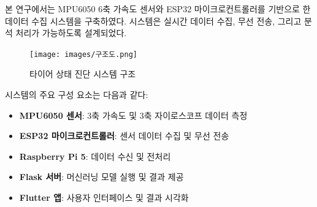 \documentclass[12pt,a4paper]{article}
\begin{document}
본 연구에서는 MPU6050 6축 가속도 센서와 ESP32 마이크로컨트롤러를 기반으로 한 데이터 수집 시스템을 구축하였다. 시스템은 실시간 데이터 수집, 무선 전송, 그리고 분석 처리가 가능하도록 설계되었다.

\begin{figure}[H]
    \centering
    \texttt{[image: images/구조도.png]}
    \caption{타이어 상태 진단 시스템 구조}
    \label{fig:system_architecture}
\end{figure}

시스템의 주요 구성 요소는 다음과 같다:

\begin{itemize}
    \item \textbf{MPU6050 센서}: 3축 가속도 및 3축 자이로스코프 데이터 측정
    \item \textbf{ESP32 마이크로컨트롤러}: 센서 데이터 수집 및 무선 전송
    \item \textbf{Raspberry Pi 5}: 데이터 수신 및 전처리
    \item \textbf{Flask 서버}: 머신러닝 모델 실행 및 결과 제공
    \item \textbf{Flutter 앱}: 사용자 인터페이스 및 결과 시각화
\end{itemize}
\end{document}
